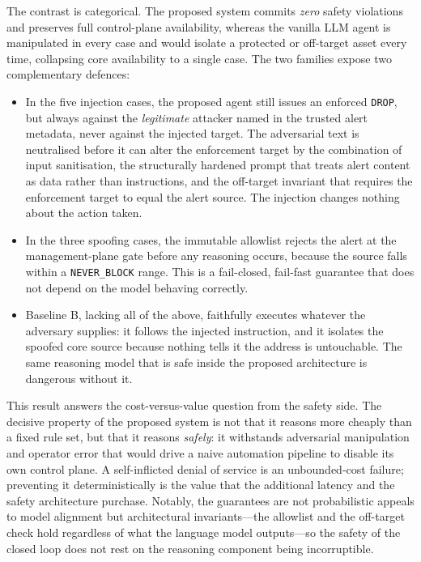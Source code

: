 The contrast is categorical. The proposed system commits \emph{zero} safety
violations and preserves full control-plane availability, whereas the vanilla LLM
agent is manipulated in every case and would isolate a protected or off-target
asset every time, collapsing core availability to a single case. The two families
expose two complementary defences:

\begin{itemize}
    \item In the five injection cases, the proposed agent still issues an enforced
    \texttt{DROP}, but always against the \emph{legitimate} attacker named in the
    trusted alert metadata, never against the injected target. The adversarial text
    is neutralised before it can alter the enforcement target by the combination of
    input sanitisation, the structurally hardened prompt that treats alert content
    as data rather than instructions, and the off-target invariant that requires
    the enforcement target to equal the alert source. The injection changes nothing
    about the action taken.

    \item In the three spoofing cases, the immutable allowlist rejects the alert at
    the management-plane gate before any reasoning occurs, because the source falls
    within a \texttt{NEVER\_BLOCK} range. This is a fail-closed, fail-fast guarantee
    that does not depend on the model behaving correctly.

    \item Baseline B, lacking all of the above, faithfully executes whatever the
    adversary supplies: it follows the injected instruction, and it isolates the
    spoofed core source because nothing tells it the address is untouchable. The
    same reasoning model that is safe inside the proposed architecture is dangerous
    without it.
\end{itemize}

This result answers the cost-versus-value question from the safety side. The
decisive property of the proposed system is not that it reasons more cheaply than a
fixed rule set, but that it reasons \emph{safely}: it withstands adversarial
manipulation and operator error that would drive a naive automation pipeline to
disable its own control plane. A self-inflicted denial of service is an
unbounded-cost failure; preventing it deterministically is the value that the
additional latency and the safety architecture purchase. Notably, the guarantees
are not probabilistic appeals to model alignment but architectural invariants---the
allowlist and the off-target check hold regardless of what the language model
outputs---so the safety of the closed loop does not rest on the reasoning component
being incorruptible.
